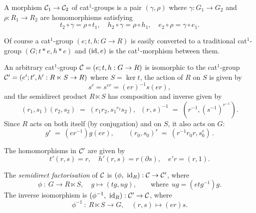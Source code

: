 A morphism  $\mathcal{C}_1 \to \mathcal{C}_2$  
of cat$^1$-groups is a pair  $(\gamma, \rho)$  where
$\gamma : G_1 \to G_2$  and  $\rho : R_1 \to R_2$  
are homomorphisms satisfying
\begin{equation} \label{eq:cat1mor}
t_2 \circ\gamma = \rho\circ t_1, \quad
h_2 \circ\gamma = \rho\circ h_1, \quad
e_2 \circ\rho = \gamma\circ e_1.
\end{equation}

Of course a cat$^1$-group $(e;t,h : G \to R)$ is easily converted 
to a traditional cat$^1$-group $(G;t*e,h*e)$ and $(\mathrm{id},e)$ 
is the cat$^1$-morphism between them. 

An arbitrary cat$^1$-group  $\mathcal{C} = (e;t,h : G \to R)$
is isomorphic to the cat$^1$-group
$\mathcal{C}' = (e';t',h' : R \ltimes S \to R)$
where  $S = \ker t$,  
the action of $R$ on $S$ is given by
$$
s^r = s^{er} = (er)^{-1} s (er),
$$
and the semidirect product  $R \ltimes S$  
has composition and inverse given by
$$
(r_1,s_1)(r_2,s_2) \; = \; (r_1r_2,{s_1}^{r_2}s_2), \;\;
(r,s)^{-1}  \; = \; (r^{-1}, (s^{-1})^{r^{-1}}).
$$
Since $R$ acts on both itself (by conjugation) and on $S$,
it also acts on $G$:
\begin{equation} \label{eq:RactsonG}
g^r ~=~ (er^{-1})g(er),  \quad\quad
(r_0,s_0)^r ~=~ (r^{-1}r_0r, s_0^r)\,.
\end{equation}

\noindent
The homomorphisms in  $\mathcal{C}'$  are given by
\begin{equation} \label{eq:sdpcat1}
t'(r,s) = r, \quad h'(r,s) = r(\partial s), \quad e'r = (r,1).
\end{equation}

\begin{defn} 
The \emph{semidirect factorisation} of $\mathcal{C}$ is 
$(\phi, ~\mathrm{id}_R) : \mathcal{C} \to \mathcal{C}'$, where
\begin{equation} \label{eq:cat1-sdp-fact} 
\phi ~:~ G \to R \ltimes S, \quad g \mapsto (tg,ug),
\qquad\mbox{where}~~  ug = (etg^{-1})g. 
\end{equation}
The inverse isomorphism is  $(\phi^{-1}, ~\mathrm{id}_R) : \mathcal{C}' \to \mathcal{C}$, where 
$$
\phi^{-1} ~:~ R \ltimes S \to G, \quad (r,s) \mapsto (er)s.
$$ 
\end{defn}

